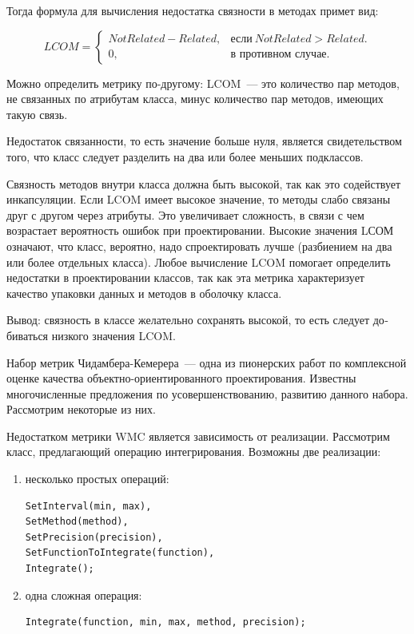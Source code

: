 \documentclass{../../text-style}
\begin{document}
Тогда  формула для вычисления недостатка связности в методах примет вид:

\begin{equation}
    LCOM=\begin{cases}
        NotRelated - Related, & \text{если}\ NotRelated > Related.\\
        0,                    & \text{в противном случае}.
    \end{cases}
\end{equation}

Можно определить метрику по-другому: LCOM~--- это количество пар методов, не связанных по атрибутам класса, минус количество пар методов, имеющих такую связь.

Недостаток связанности, то есть значение больше нуля, является свидетельством того, что класс следует разделить на два или более меньших подклассов.

Связность методов внутри класса должна быть высокой, так как это содействует инкапсуляции. Если LCOM имеет высокое значение, то методы слабо связаны друг с другом через атрибуты. Это увеличивает сложность, в связи с чем возрастает вероятность ошибок при проектировании. Высокие значения LСОМ означают, что класс, вероятно, надо спроектировать лучше (разбиением на два или более отдельных класса). Любое вычисление LCOM помогает определить недостатки в проектировании классов, так как эта метрика характеризует качество упаковки данных и методов в оболочку класса.

Вывод: связность в классе желательно сохранять высокой, то есть следует до­биваться низкого значения LCOM. 

Набор метрик Чидамбера-Кемерера~--- одна из пионерских работ по комплексной оценке качества объектно-ориентированного проектирования. Известны многочисленные предложения по усовершенствованию, развитию данного набора. Рассмотрим некоторые из них.

Недостатком метрики WMC является зависимость от реализации. Рассмотрим класс, предлагающий операцию интегрирования. Возможны две реализации:

\begin{enumerate}
    \item несколько простых операций:
    \begin{verbatim}
SetInterval(min, max),
SetMethod(method),
SetPrecision(precision),
SetFunctionToIntegrate(function),
Integrate();
    \end{verbatim}
    \item одна сложная операция:
    \begin{verbatim}
Integrate(function, min, max, method, precision);
    \end{verbatim}
\end{enumerate}
\end{document}
